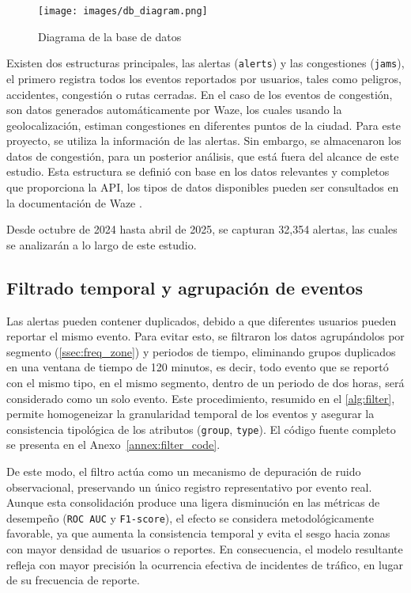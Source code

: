 \documentclass[12pt]{article}
\begin{document}
\begin{figure}[H]
    \centering
    \texttt{[image: images/db\_diagram.png]}
    \caption{Diagrama de la base de datos}
    \label{fig:db_diagram}
\end{figure}

Existen dos estructuras principales, las alertas (\texttt{alerts}) y las congestiones (\texttt{jams}), el primero registra todos los eventos reportados por usuarios, tales como peligros, accidentes, congestión o rutas cerradas. En el caso de los eventos de congestión, son datos generados automáticamente por Waze, los cuales usando la geolocalización, estiman congestiones en diferentes puntos de la ciudad. Para este proyecto, se utiliza la información de las alertas. Sin embargo, se almacenaron los datos de congestión, para un posterior análisis, que está fuera del alcance de este estudio. Esta estructura se definió con base en los datos relevantes y completos que proporciona la API, los tipos de datos disponibles pueden ser consultados en la documentación de Waze \citep{waze2024}.

Desde octubre de 2024 hasta abril de 2025, se capturan 32,354 alertas, las cuales se analizarán a lo largo de este estudio.

\subsection{Filtrado temporal y agrupación de eventos}

Las alertas pueden contener duplicados, debido a que diferentes usuarios pueden reportar el mismo evento. Para evitar esto, se filtraron los datos agrupándolos por segmento (\cref{ssec:freq_zone}) y periodos de tiempo, eliminando grupos duplicados en una ventana de tiempo de 120 minutos, es decir, todo evento que se reportó con el mismo tipo, en el mismo segmento, dentro de un periodo de dos horas, será considerado como un solo evento. Este procedimiento, resumido en el \cref{alg:filter}, permite homogeneizar la granularidad temporal de los eventos y asegurar la consistencia tipológica de los atributos (\texttt{group}, \texttt{type}). El código fuente completo se presenta en el Anexo~\ref{annex:filter_code}.

De este modo, el filtro actúa como un mecanismo de depuración de ruido observacional, preservando un único registro representativo por evento real. Aunque esta consolidación produce una ligera disminución en las métricas de desempeño (\texttt{ROC AUC} y \texttt{F1-score}), el efecto se considera metodológicamente favorable, ya que aumenta la consistencia temporal y evita el sesgo hacia zonas con mayor densidad de usuarios o reportes. En consecuencia, el modelo resultante refleja con mayor precisión la ocurrencia efectiva de incidentes de tráfico, en lugar de su frecuencia de reporte.
\end{document}
